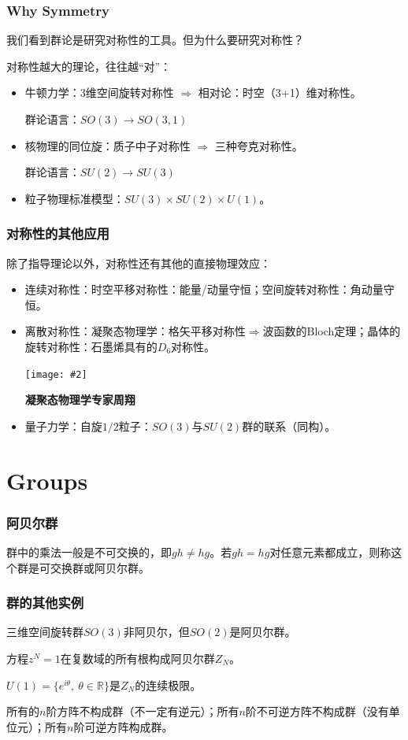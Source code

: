 \documentclass[CJK]{beamer}
\newcommand{\reals}{\mathbb{R}}
\newcommand{\cpic}[2]{
\begin{center}
\texttt{[image: \#2]}
\end{center}
}
\begin{document}
\begin{frame}
\frametitle{\bch Why Symmetry \ech}
\bch
我们看到群论是研究对称性的工具。但为什么要研究对称性？
\par
对称性越大的理论，往往越“对”：
\begin{itemize}
\item 牛顿力学：3维空间旋转对称性 $\Rightarrow$ 相对论：时空（3+1）维对称性。
\par
群论语言：$SO(3) \to SO(3,1)$
\item 核物理的同位旋：质子中子对称性 $\Rightarrow$ 三种夸克对称性。
\par
群论语言：$SU(2) \to SU(3)$
\item 粒子物理标准模型：$SU(3) \times SU(2) \times U(1)$。
\end{itemize}

\ech
\end{frame}

\begin{frame}
\frametitle{\bch 对称性的其他应用 \ech}
\bch
除了指导理论以外，对称性还有其他的直接物理效应：

\begin{itemize}
\item 连续对称性：时空平移对称性：能量/动量守恒；空间旋转对称性：角动量守恒。
\item 离散对称性：凝聚态物理学：格矢平移对称性$\Rightarrow$波函数的Bloch定理；晶体的旋转对称性：石墨烯具有的$D_6$对称性。
\cpic{0.2}{zx}
\begin{center}
{\small \bf 凝聚态物理学专家周翔}
\end{center}
\item 量子力学：自旋$1/2$粒子：$SO(3)$与$SU(2)$群的联系（同构）。
\end{itemize}

\ech
\end{frame}

\section{Groups}
\begin{frame}
\frametitle{\bch 阿贝尔群 \ech}
\bch
群中的乘法一般是不可交换的，即$gh \not= hg$。若$gh = hg$对任意元素都成立，则称这个群是可交换群或阿贝尔群。

\ech
\end{frame}

\begin{frame}
\frametitle{\bch 群的其他实例 \ech}
\bch
三维空间旋转群$SO(3)$非阿贝尔，但$SO(2)$是阿贝尔群。
\par
方程$z^N = 1$在复数域的所有根构成阿贝尔群$Z_N$。
\par
$U(1) = \{ e^{i \theta},\ \theta \in \reals\}$是$Z_N$的连续极限。
\par
所有的$n$阶方阵不构成群（不一定有逆元）；所有$n$阶不可逆方阵不构成群（没有单位元）；所有$n$阶可逆方阵构成群。

\ech
\end{frame}
\end{document}

